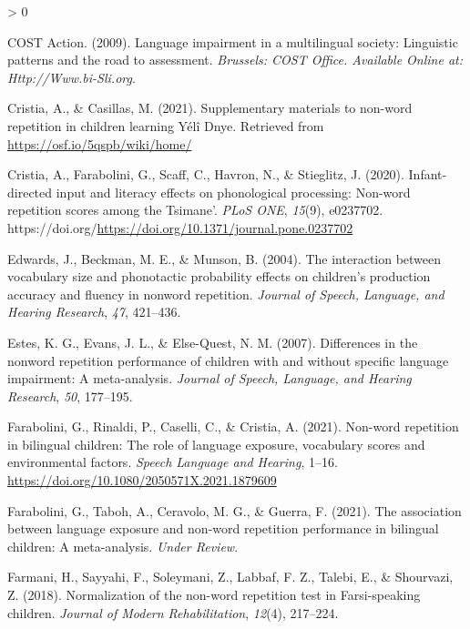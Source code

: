 \documentclass[
  american,
  ,man,floatsintext]{apa6}
\newlength{\cslhangindent}
\newenvironment{CSLReferences}[2] %
 {%
  \setlength{\parindent}{0pt}
  \ifodd #1 \everypar{\setlength{\hangindent}{\cslhangindent}}\ignorespaces\fi
  \ifnum #2 > 0
  \setlength{\parskip}{#2\baselineskip}
  \fi
 }%
 {}
\begin{document}
\begin{CSLReferences}{1}{0}
\leavevmode\hypertarget{ref-is08042009language}{}%
COST Action. (2009). Language impairment in a multilingual society: Linguistic patterns and the road to assessment. \emph{Brussels: COST Office. Available Online at: Http://Www.bi-Sli.org}.

\leavevmode\hypertarget{ref-cristia2021supplementary}{}%
Cristia, A., \& Casillas, M. (2021). Supplementary materials to non-word repetition in children learning {Yélî D}nye. Retrieved from \url{https://osf.io/5qspb/wiki/home/}

\leavevmode\hypertarget{ref-cristia2020infant}{}%
Cristia, A., Farabolini, G., Scaff, C., Havron, N., \& Stieglitz, J. (2020). Infant-directed input and literacy effects on phonological processing: Non-word repetition scores among the {T}simane'. \emph{PLoS ONE}, \emph{15}(9), e0237702. https://doi.org/\url{https://doi.org/10.1371/journal.pone.0237702}

\leavevmode\hypertarget{ref-edwards2004interaction}{}%
Edwards, J., Beckman, M. E., \& Munson, B. (2004). The interaction between vocabulary size and phonotactic probability effects on children's production accuracy and fluency in nonword repetition. \emph{Journal of Speech, Language, and Hearing Research}, \emph{47}, 421--436.

\leavevmode\hypertarget{ref-estes2007differences}{}%
Estes, K. G., Evans, J. L., \& Else-Quest, N. M. (2007). Differences in the nonword repetition performance of children with and without specific language impairment: A meta-analysis. \emph{Journal of Speech, Language, and Hearing Research}, \emph{50}, 177--195.

\leavevmode\hypertarget{ref-farabolini2021nonword}{}%
Farabolini, G., Rinaldi, P., Caselli, C., \& Cristia, A. (2021). Non-word repetition in bilingual children: The role of language exposure, vocabulary scores and environmental factors. \emph{Speech Language and Hearing}, 1--16. \url{https://doi.org/10.1080/2050571X.2021.1879609}

\leavevmode\hypertarget{ref-farabolini2021association}{}%
Farabolini, G., Taboh, A., Ceravolo, M. G., \& Guerra, F. (2021). The association between language exposure and non-word repetition performance in bilingual children: A meta-analysis. \emph{Under Review}.

\leavevmode\hypertarget{ref-farmani2018normalization}{}%
Farmani, H., Sayyahi, F., Soleymani, Z., Labbaf, F. Z., Talebi, E., \& Shourvazi, Z. (2018). Normalization of the non-word repetition test in {F}arsi-speaking children. \emph{Journal of Modern Rehabilitation}, \emph{12}(4), 217--224.


\end{CSLReferences}
\end{document}
